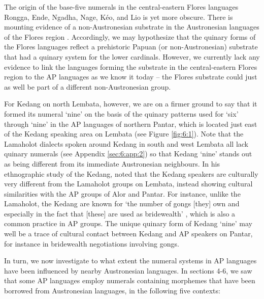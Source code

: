The origin of the base-five numerals in the central-eastern Flores languages Rongga, Ende, Ngadha, Nage, K\'eo, and Lio is yet more obscure. There is mounting evidence of a non-Austronesian substrate in the Austronesian languages of the Flores region \citep[see, e.g.,][]{Capell1976,Klamer2012}. Accordingly, we may hypothesize that the quinary forms of the Flores languages reflect a prehistoric Papuan (or non-Austronesian) substrate that had a quinary system for the lower cardinals. However, we currently lack any evidence to link the languages forming the substrate in the central-eastern Flores region to the AP languages as we know it today -- the Flores substrate could just as well be part of a different non-Austronesian group. 

For Kedang on north Lembata, however, we are on a firmer ground to say that it formed its numeral `nine' on the basis of the quinary patterns used for `six' through `nine' in the AP languages of northern Pantar, which is located just east of the Kedang speaking area on Lembata (see Figure \ref{fig:6:1}). 
Note that the Lamaholot dialects spoken around Kedang in south and west Lembata all lack quinary numerals (see Appendix \ref{sec:6:app:2}) so that Kedang `nine' stands out as being different from its immediate Austronesian neighbours. In his ethnographic study of the Kedang, \citet{Barnes1974} noted that the Kedang speakers are culturally very different from the Lamaholot groups on Lembata, instead showing cultural similarities with the AP groups of Alor and Pantar. For instance, unlike the Lamaholot, the Kedang are known for `the number of gongs [they] own and especially in the fact that [these] are used as bridewealth' \citep[15]{Barnes1974}, which is also a common practice in AP groups. The unique quinary form of Kedang `nine' may well be a trace of cultural contact between Kedang and AP speakers on Pantar, for instance in bridewealth negotiations involving gongs. 

In turn, we now investigate to what extent the numeral systems in AP languages have been influenced by nearby Austronesian languages. In sections 4-6, we saw that some AP languages employ numerals containing morphemes that have been borrowed from Austronesian languages, in the following five contexts: 


